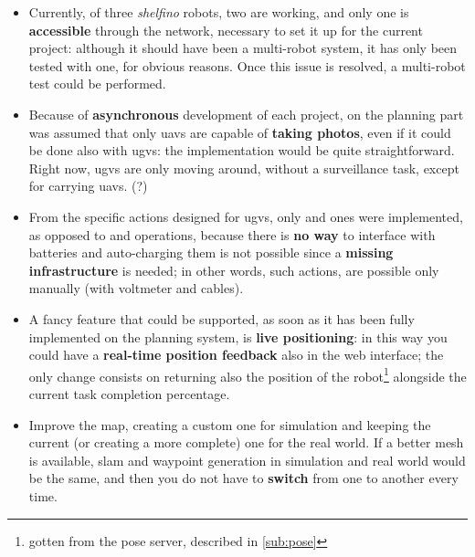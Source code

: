\begin{itemize}

\item Currently, of three \textit{shelfino} robots, two are working, and only one is \textbf{accessible} through the network, necessary to set it up for the current project: although it should have been a multi-robot system, it has only been tested with one, for obvious reasons. Once this issue is resolved, a multi-robot test could be performed.

\item Because of \textbf{asynchronous} development of each project, on the planning part was assumed that only \acrshort{uav}s are capable of \textbf{taking photos}, even if it could be done also with \acrshort{ugv}s: the implementation would be quite straightforward. Right now, \acrshort{ugv}s are only moving around, without a surveillance task, except for carrying \acrshort{uav}s. (?) 

\item From the specific actions designed for \acrshort{ugv}s, only  and  ones were implemented, as opposed to  and  operations, because there is \textbf{no way} to interface with batteries and auto-charging them is not possible since a \textbf{missing infrastructure} is needed; in other words, such actions, are possible only manually (with voltmeter and cables).

\item A fancy feature that could be supported, as soon as it has been fully implemented on the planning system, is \textbf{live positioning}: in this way you could have a \textbf{real-time position feedback} also in the web interface; the only change consists on returning also the position of the robot\footnote{gotten from the pose server, described in \autoref{sub:pose}} alongside the current task completion percentage.


\item Improve the map, creating a custom one for simulation and keeping the current (or creating a more complete) one for the real world. If a better mesh is available, \acrshort{slam} and waypoint generation in simulation and real world would be the same, and then you do not have to \textbf{switch} from one to another every time.


\end{itemize}